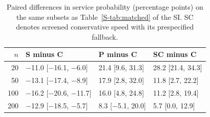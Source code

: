 \begin{table}[t]
\centering
\small
\caption{Paired differences in service probability (percentage points) on the same subsets as Table~\ref{S-tab:matched} of the SI. SC denotes screened conservative speed with its prespecified fallback.}
\label{tab:paired}
\begin{tabular}{rlll}
\toprule
$n$ & S minus C & P minus C & SC minus C\\
\midrule
20 & $-$11.0 [$-$16.1, $-$6.0] & 21.4 [9.6, 31.3] & 28.2 [21.4, 34.3]\\
50 & $-$13.1 [$-$17.4, $-$8.9] & 17.9 [2.8, 32.0] & 11.8 [2.7, 22.2]\\
100 & $-$16.2 [$-$20.6, $-$11.7] & 16.0 [4.8, 24.8] & 11.2 [2.8, 19.4]\\
200 & $-$12.9 [$-$18.5, $-$5.7] & 8.3 [$-$5.1, 20.0] & 5.7 [0.0, 12.9]\\
\bottomrule
\end{tabular}
\end{table}
